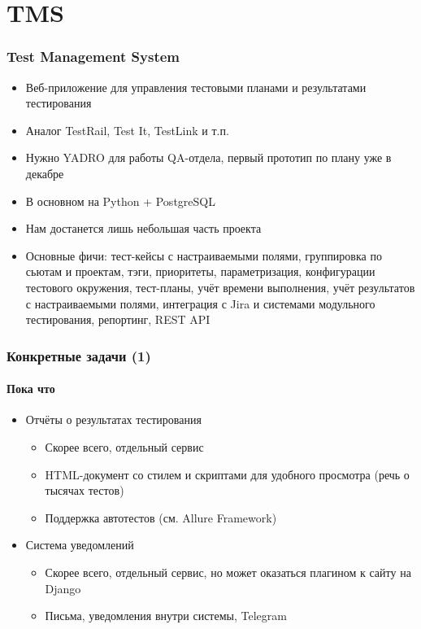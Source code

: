 \documentclass{slides-style}
\begin{document}
    \begin{frame}[plain]
        \titlepage
    \end{frame}

    \section{TMS}

    \begin{frame}
        \frametitle{Test Management System}
        \begin{itemize}
            \item Веб-приложение для управления тестовыми планами и результатами тестирования
            \item Аналог TestRail, Test It, TestLink и т.п.
            \item Нужно YADRO для работы QA-отдела, первый прототип по плану уже в декабре
            \item В основном на Python + PostgreSQL
            \item Нам достанется лишь небольшая часть проекта
            \item Основные фичи: тест-кейсы с настраиваемыми полями, группировка по сьютам и проектам, тэги, приоритеты, параметризация, конфигурации тестового окружения, тест-планы, учёт времени выполнения, учёт результатов с настраиваемыми полями, интеграция с Jira и системами модульного тестирования, репортинг, REST API
        \end{itemize}
    \end{frame}

    \begin{frame}
        \frametitle{Конкретные задачи (1)}
        \framesubtitle{Пока что}
        \begin{itemize}
            \item Отчёты о результатах тестирования
            \begin{itemize}
                \item Скорее всего, отдельный сервис
                \item HTML-документ со стилем и скриптами для удобного просмотра (речь о тысячах тестов)
                \item Поддержка автотестов (см. Allure Framework)
            \end{itemize}
            \item Система уведомлений
            \begin{itemize}
                \item Скорее всего, отдельный сервис, но может оказаться плагином к сайту на Django
                \item Письма, уведомления внутри системы, Telegram
            \end{itemize}
        \end{itemize}
    \end{frame}
\end{document}

